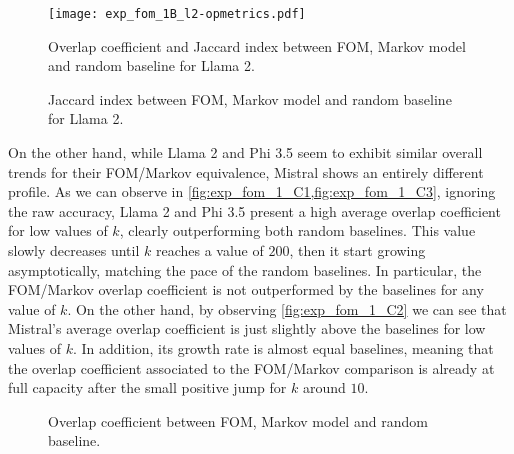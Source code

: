 \begin{figure}[t!]
    \centering
    \texttt{[image: exp\_fom\_1B\_l2-opmetrics.pdf]}
    \caption[Overlap coefficient and Jaccard index for Llama 2.]{Overlap coefficient and Jaccard index between FOM, Markov model and random baseline for Llama 2.}
    \label{fig:exp_fom_1_B1}
\end{figure}
\begin{figure}[t!]
    \caption[Jaccard index for Llama 2 considering FOM and FOM with RMS.]{Jaccard index between FOM, Markov model and random baseline for Llama 2.}
    \label{fig:exp_fom_1_B}
\end{figure}

On the other hand,  while Llama 2 and Phi 3.5 seem to exhibit similar overall trends for their FOM/Markov equivalence, Mistral shows an entirely different profile.
As we can observe in \cref{fig:exp_fom_1_C1,fig:exp_fom_1_C3}, ignoring the raw accuracy, Llama 2 and Phi 3.5 present a high average overlap coefficient for low values of $k$, clearly outperforming both random baselines.
This value slowly decreases until $k$ reaches a value  of $200$, then it start growing asymptotically, matching the pace of the random baselines.
In particular, the FOM/Markov overlap coefficient is not outperformed by the baselines for any value of $k$.
On the other hand, by observing \cref{fig:exp_fom_1_C2} we can see that Mistral's average overlap coefficient is just slightly above the baselines for low values of $k$.
In addition, its growth rate is almost equal  baselines, meaning that the overlap coefficient associated to the FOM/Markov comparison is already at full capacity after the small positive jump for $k$ around $10$.

\begin{figure}[t!]
    \centering
    \caption{Overlap coefficient between FOM, Markov model and random baseline.}
    \label{fig:exp_fom_1_C}
\end{figure}

